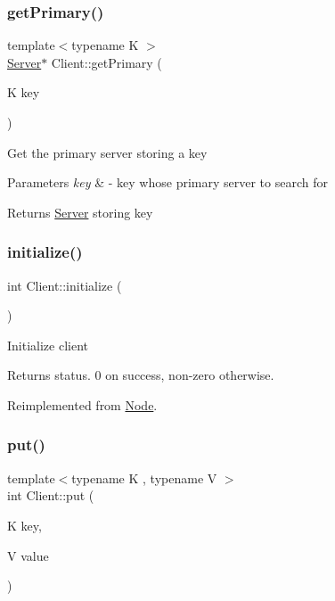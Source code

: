 \subsubsection{\texorpdfstring{get\+Primary()}{getPrimary()}}
{\footnotesize\ttfamily template$<$typename K $>$ \\
\mbox{\hyperlink{classServer}{Server}}$\ast$ Client\+::get\+Primary (\begin{DoxyParamCaption}\item[{K}]{key }\end{DoxyParamCaption})\hspace{0.3cm}{\ttfamily [inline]}}

Get the primary server storing a key


\begin{DoxyParams}{Parameters}
{\em key} & -\/ key whose primary server to search for\\
\hline
\end{DoxyParams}
\begin{DoxyReturn}{Returns}
\mbox{\hyperlink{classServer}{Server}} storing key 
\end{DoxyReturn}
\mbox{\label{classClient_a5de857af6e3c568925ecd342314617d7}} 
\subsubsection{\texorpdfstring{initialize()}{initialize()}}
{\footnotesize\ttfamily int Client\+::initialize (\begin{DoxyParamCaption}{ }\end{DoxyParamCaption})\hspace{0.3cm}{\ttfamily [virtual]}}

Initialize client

\begin{DoxyReturn}{Returns}
status. 0 on success, non-\/zero otherwise. 
\end{DoxyReturn}


Reimplemented from \mbox{\hyperlink{classNode_acfbc12d3b7d414fb12811041b04a1809}{Node}}.

\mbox{\label{classClient_aaa4866468879b4e1f6905756191e20d1}} 
\subsubsection{\texorpdfstring{put()}{put()}}
{\footnotesize\ttfamily template$<$typename K , typename V $>$ \\
int Client\+::put (\begin{DoxyParamCaption}\item[{K}]{key,  }\item[{V}]{value }\end{DoxyParamCaption})\hspace{0.3cm}{\ttfamily [inline]}}

